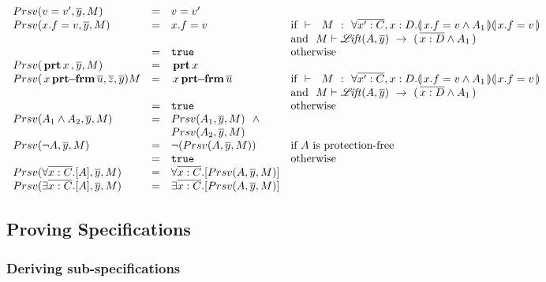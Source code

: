 {\small{
$\begin{array}{lcll}
\\
\\
\preserve {v=v'} {\overline  y} M  & = &  v=v' 
\\
\preserve {x.f=v} {\overline  y} M & = & x.f=v  & \mbox{if} \ \ \promises M   {\TwoStatesQ {\overline {x':C},x:D} {x.f = v \wedge A_1}{x.f=v}} 
\\ 
& & & \mbox{and} \ \ M \vdash {\lift A  {\overline   y}} \  \rightarrow \ (\, {\overline {x:D}} \wedge A_1\, )
\\
   & = &   \prg{true} & \mbox{otherwise}
   \\
\preserve  { \inside x}  {\overline   y}  M & = &   \inside x 
\\
\preserve  { \protectedFrom x {\overline {u}} }  {\overline z} {\overline y} M  & = &   { \protectedFrom x {\overline {u}} }  & \mbox{if} \ \ \promises M   {\TwoStatesQ {\overline {x':C},x:D} {x.f = v \wedge A_1}{x.f=v}} 
\\ 
& & & \mbox{and} \ \ M \vdash {\lift A  {\overline  y}} \  \rightarrow \ (\, {\overline {x:D}} \wedge A_1\, )
\\
   & = &   \prg{true} & \mbox{otherwise}

\\
\preserve  {A_1 \wedge A_2} {\overline  y}  M & = & \preserve { A_1}  {\overline y}  M \ \ \wedge \\
& &  \preserve { A_2}  {\overline   y}  M
\\
\preserve  {\neg A}{\overline  y}  M   & = & \neg (\preserve {A} {\overline   y}  M)& \mbox{if  $A$ is protection-free}
\\
  & = &  \prg{true} & \mbox{otherwise}
\\
\preserve {\forall \overline{x:C}.[ A ]} {\overline   y}  M   & = & \forall \overline{x:C}.[ \preserve A  {\overline  y}  M ] & 
\\
\preserve {\exists \overline{x:C}.[ A ]} {\overline  y}  M   & = & \exists \overline{x:C}.[ \preserve A {\overline   y}  M  ] & 
\end{array}
$
}}

\subsection{Proving \SpecLang Specifications}

\subsubsection{Deriving sub-specifications}


